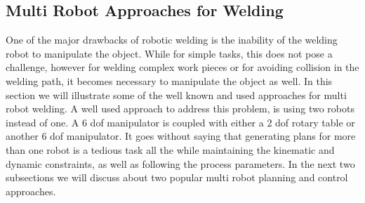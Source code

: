 \newpage
\subsection{Multi Robot Approaches for Welding}

One of the major drawbacks of robotic welding is the inability of the welding robot to manipulate the object. While for simple tasks, this does not pose a challenge, however for welding complex work pieces or for avoiding collision in the welding path, it becomes necessary to manipulate the object as well. In this section we will illustrate some of the well known and used approaches for multi robot welding. 
A well used approach to address this problem, is using two robots instead of one. A 6 dof manipulator is coupled with either a 2 dof rotary table or another 6 dof manipulator. It goes without saying that generating plans for more than one robot is a tedious task all the while maintaining the kinematic and dynamic constraints, as well as following the process parameters. In the next two subsections we will discuss about two popular multi robot planning and control approaches.


